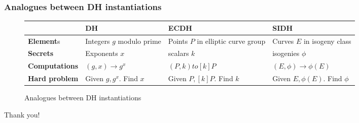\documentclass{beamer}
\begin{document}
\begin{frame}
\frametitle{Analogues between DH instantiations}
\begin{figure}[h]
	\begin{center}
		\begin{tabular}{| m{2.3cm} | m{2.5cm} m{2.5cm} m{2.5cm} |}
			\hline
			~ & DH & ECDH & SIDH\\
			\hline
			\textbf{Element}s & Integers $g$ modulo prime & Points $P$ in elliptic curve group & Curves $E$ in isogeny class\\
			\hline
			\textbf{Secrets} & Exponents $x$ & scalars $k$ & isogenies $\phi$ \\
			\hline
			\textbf{Computations} & $(g, x) \to g^x$ & $(P, k) to [k]P$ & $(E, \phi) \to \phi(E)$\\
			\hline
			\textbf{Hard problem} & Given $g, g^x$. Find $x$ & Given $P,[k]P$. Find $k$ & Given $E, \phi(E)$. Find $\phi$\\
			\hline 
		\end{tabular}
	\end{center}
	\caption{Analogues between DH instantiations}\label{DH-Analogues-table:figure}
\end{figure}
\end{frame}

\begin{frame}
	\begin{center}
		\Huge{Thank you!}
	\end{center}
\end{frame}
\end{document}
